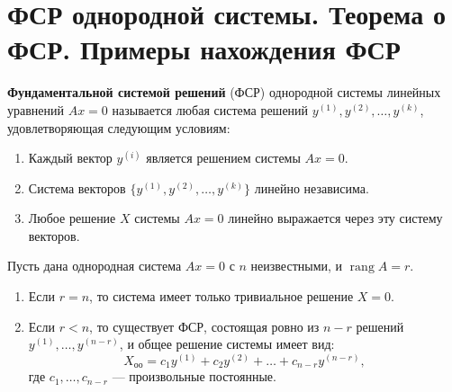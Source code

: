 \section{ФСР однородной системы. Теорема о ФСР. Примеры нахождения ФСР}

\begin{definition}
\textbf{Фундаментальной системой решений} (ФСР) однородной системы линейных уравнений $Ax = 0$ называется любая система решений $y^{(1)}, y^{(2)}, \dots, y^{(k)}$, удовлетворяющая следующим условиям:
\begin{enumerate}
    \item Каждый вектор $y^{(i)}$ является решением системы $Ax = 0$.
    \item Система векторов $\{y^{(1)}, y^{(2)}, \dots, y^{(k)}\}$ линейно независима.
    \item Любое решение $X$ системы $Ax = 0$ линейно выражается через эту систему векторов.
\end{enumerate}
\end{definition}

\begin{theorem}
Пусть дана однородная система $Ax = 0$ с $n$ неизвестными, и $\operatorname{rang} A = r$. 
\begin{enumerate}
    \item Если $r = n$, то система имеет только тривиальное решение $X = 0$.
    \item Если $r < n$, то существует ФСР, состоящая ровно из $n - r$ решений $y^{(1)}, \dots, y^{(n-r)}$, и общее решение системы имеет вид:
    \[
    X_{оо} = c_1 y^{(1)} + c_2 y^{(2)} + \dots + c_{n-r} y^{(n-r)},
    \]
    где $c_1, \dots, c_{n-r}$ --- произвольные постоянные.
\end{enumerate}
\end{theorem}


